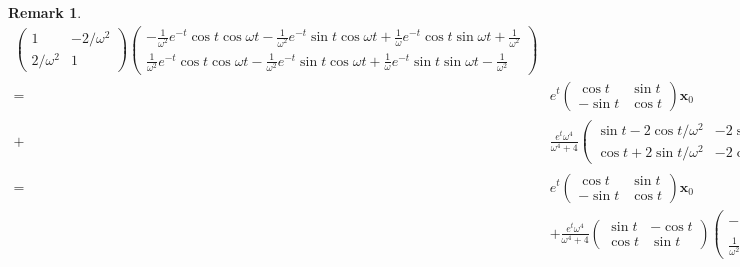 \documentclass{jsarticle}
\newtheorem{remark}{Remark}
\begin{document}
\begin{remark}
\begin{align}
\begin{pmatrix}
1 & -2/\omega^{2}\\
2/\omega^{2} & 1
\end{pmatrix}
\begin{pmatrix}
-\frac{1}{\omega^{2}}e^{-t}\cos t\cos\omega t
-\frac{1}{\omega^{2}}e^{-t}\sin t\cos\omega t
+\frac{1}{\omega}e^{-t}\cos t\sin\omega t
+\frac{1}{\omega^{2}}\\
\frac{1}{\omega^{2}}e^{-t}\cos t\cos\omega t
-\frac{1}{\omega^{2}}e^{-t}\sin t\cos\omega t
+\frac{1}{\omega}e^{-t}\sin t\sin\omega t
-\frac{1}{\omega^{2}}
\end{pmatrix}\\
=&e^{t}
\begin{pmatrix}
\cos t & \sin t\\
-\sin t & \cos t
\end{pmatrix}
\boldsymbol{x}_{0}\\
+&\frac{e^{t}\omega^{4}}{\omega^{4}+4}
\begin{pmatrix}
\sin t-2\cos t/\omega^{2} & -2\sin t/\omega^{2}-\cos t\\
\cos t+2\sin t/\omega^{2} & -2\cos t/\omega^{2}+\sin t
\end{pmatrix}
\begin{pmatrix}
-\frac{1}{\omega^{2}}e^{-t}\cos t\cos\omega t
-\frac{1}{\omega^{2}}e^{-t}\sin t\cos\omega t
+\frac{1}{\omega}e^{-t}\cos t\sin\omega t
+\frac{1}{\omega^{2}}\\
\frac{1}{\omega^{2}}e^{-t}\cos t\cos\omega t
-\frac{1}{\omega^{2}}e^{-t}\sin t\cos\omega t
+\frac{1}{\omega}e^{-t}\sin t\sin\omega t
-\frac{1}{\omega^{2}}
\end{pmatrix}\\
=&e^{t}
\begin{pmatrix}
\cos t & \sin t\\
-\sin t & \cos t
\end{pmatrix}
\boldsymbol{x}_{0}\\
&+\frac{e^{t}\omega^{4}}{\omega^{4}+4}
\begin{pmatrix}
\sin t & -\cos t\\
\cos t & \sin t
\end{pmatrix}
\begin{pmatrix}
-\frac{1}{\omega^{2}}e^{-t}\cos t\cos\omega t
-\frac{1}{\omega^{2}}e^{-t}\sin t\cos\omega t
+\frac{1}{\omega}e^{-t}\cos t\sin\omega t
+\frac{1}{\omega^{2}}\\
\frac{1}{\omega^{2}}e^{-t}\cos t\cos\omega t
-\frac{1}{\omega^{2}}e^{-t}\sin t\cos\omega t
+\frac{1}{\omega}e^{-t}\sin t\sin\omega t
-\frac{1}{\omega^{2}}
\end{pmatrix}\\

\end{align}
\end{remark}
\end{document}
